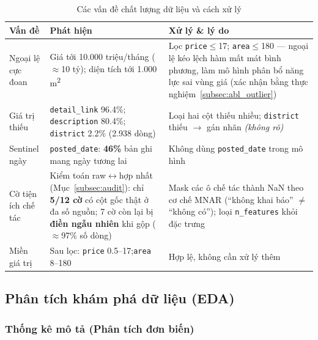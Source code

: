 \begin{table}[H]
  \centering
  \caption{Các vấn đề chất lượng dữ liệu và cách xử lý}
  \label{tab:quality}
  \begin{tabularx}{\textwidth}{@{}L{3.0cm} L{5.2cm} X@{}}
    \toprule
    \textbf{Vấn đề} & \textbf{Phát hiện} & \textbf{Xử lý \& lý do} \\
    \midrule
    Ngoại lệ cực đoan &
      Giá tới 10.000 triệu/tháng ($\approx$10 tỷ); diện tích tới 1.000 m\textsuperscript{2} &
      Lọc \texttt{price}$\leq$17; \texttt{area}$\leq$180 — ngoại lệ kéo lệch
      hàm mất mát bình phương, làm mô hình phân bổ năng lực sai vùng giá
      (xác nhận bằng thực nghiệm~\ref{subsec:abl_outlier}) \\
    \addlinespace
    Giá trị thiếu &
      \texttt{detail\_link} 96.4\%;\newline
      \texttt{description} 80.4\%;\newline
      \texttt{district} 2.2\% (2.938 dòng) &
      Loại hai cột thiếu nhiều;\newline
      \texttt{district} thiếu $\to$ gán nhãn \textit{(không rõ)} \\
    \addlinespace
    Sentinel ngày &
      \texttt{posted\_date}: \textbf{46\%} bản ghi mang ngày tương lai &
      Không dùng \texttt{posted\_date} trong mô hình \\
    \addlinespace
    Cờ tiện ích chế tác &
      Kiểm toán raw$\leftrightarrow$hợp nhất (Mục~\ref{subsec:audit}): chỉ \textbf{5/12 cờ}
      có cột gốc thật ở đa số nguồn; 7 cờ còn lại bị \textbf{điền ngẫu nhiên} khi gộp
      ($\approx$97\% số dòng) &
      Mask các ô chế tác thành NaN theo cơ chế MNAR
      (``không khai báo'' $\neq$ ``không có'');
      loại \texttt{n\_features} khỏi đặc trưng \\
    \addlinespace
    Miền giá trị &
      Sau lọc: \texttt{price} 0.5--17;\quad \texttt{area} 8--180 &
      Hợp lệ, không cần xử lý thêm \\
    \bottomrule
  \end{tabularx}
\end{table}

\subsection{Phân tích khám phá dữ liệu (EDA)}
\label{subsec:eda}

\subsubsection*{Thống kê mô tả (Phân tích đơn biến)}

